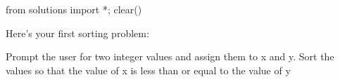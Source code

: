 \begin{python0}
from solutions import *; clear()
\end{python0}

Here's your first sorting problem:

\begin{tightlist}
\li
  Prompt the user for two integer values and assign them to x and y.
\li
  Sort the values so that the value of x is less than or equal to the
  value of y
\end{tightlist}

